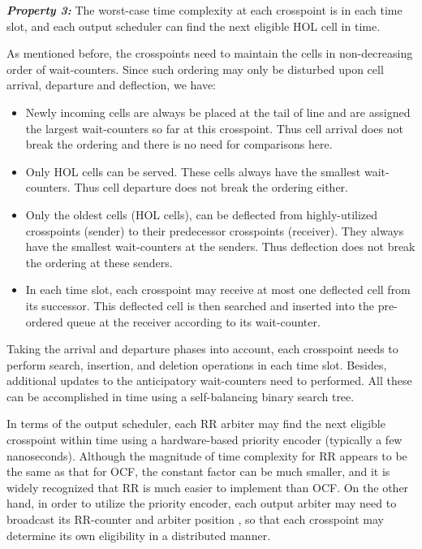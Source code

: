 \documentclass[journal,final,doublecolumn,10pt,twoside]{IEEEtranTCOM} \normalsize
\begin{document}
\textbf{\emph{Property 3:}} The worst-case time complexity at each crosspoint is  in each time slot, and each output scheduler can find the next eligible HOL cell in  time.

As mentioned before, the crosspoints need to maintain the cells in non-decreasing order of wait-counters. Since such ordering may only be disturbed upon cell arrival, departure and deflection, we have:
\begin{itemize}
\item
Newly incoming cells are always be placed at the tail of line and are assigned the largest wait-counters so far at this crosspoint. Thus cell arrival does not break the ordering and there is no need for comparisons here.

\item
Only HOL cells can be served. These cells always have the smallest wait-counters. Thus cell departure does not break the ordering either.

\item
Only the oldest cells (HOL cells), can be deflected from highly-utilized crosspoints (sender) to their predecessor crosspoints (receiver). They always have the smallest wait-counters at the senders. Thus deflection does not break the ordering at these senders.

\item
In each time slot, each crosspoint may receive at most one deflected cell from its successor. This deflected cell is then searched and inserted into the pre-ordered queue at the receiver according to its wait-counter.

\end{itemize}

Taking the arrival and departure phases into account, each crosspoint needs to perform  search, insertion, and deletion operations in each time slot. Besides,  additional updates to the anticipatory wait-counters need to performed. All these can be accomplished in  time using a self-balancing binary search tree.

In terms of the output scheduler, each RR arbiter may find the next eligible crosspoint within  time using a hardware-based priority encoder \cite{arbiter} (typically a few nanoseconds). Although the magnitude of time complexity for RR appears to be the same as that for OCF, the constant factor can be much smaller, and it is widely recognized that RR is much easier to implement than OCF. On the other hand, in order to utilize the priority encoder, each output arbiter  may need to broadcast its RR-counter  and arbiter position , so that each crosspoint may determine its own eligibility in a distributed manner.
\end{document}
